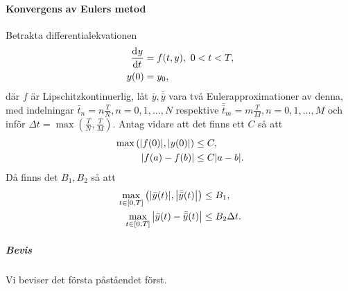 \paragraph{Konvergens av Eulers metod}
Betrakta differentialekvationen
\begin{align*}
	\dv[]{y}{t} (t) &= f(t, y),\ 0 < t < T, \\
	y(0)             &= y_0,
\end{align*}
där $f$ är Lipschitzkontinuerlig, låt $\bar{y}, \bar{\bar{y}}$ vara två Eulerapproximationer av denna, med indelningar $\bar{t}_n = n\frac{T}{N}, n = 0, 1, \dots, N$ respektive $\bar{\bar{t}}_{m} = m\frac{T}{M}, n = 0, 1, \dots, M$ och inför $\Delta t = \max\left(\frac{T}{N}, \frac{T}{M}\right)$. Antag vidare att det finns ett $C$ så att
\begin{align*}
	\max\left(\abs{f(0)}, \abs{y(0)}\right) &\leq C, \\
	\abs{f(a) - f(b)}                       &\leq C\abs{a - b}.
\end{align*}
Då finns det $B_{1}, B_{2}$ så att
\begin{align*}
	\max\limits_{t\in [0, T]}\left(\abs{\bar{y}(t)}, \abs{\bar{\bar{y}}(t)}\right) &\leq B_{1}, \\
	\max\limits_{t\in [0, T]}\abs{\bar{y}(t) - \bar{\bar{y}}(t)}                   &\leq B_{2}\Delta t.
\end{align*}

\subparagraph{Bevis}
Vi beviser det första påståendet först.

